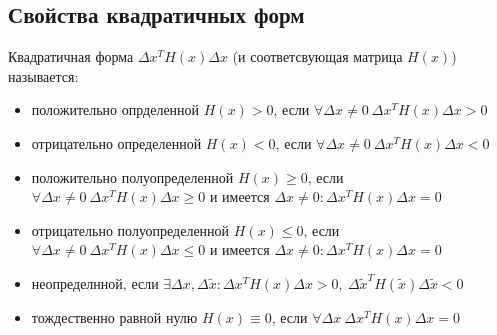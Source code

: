 \documentclass[oneside]{book}
\theoremstyle{plain}
\theoremstyle{remark}
\theoremstyle{definition}
\begin{document}
\subsection{Свойства квадратичных форм}
\label{sec:orgccb4229}
Квадратичная форма \(\Delta x^T H(x) \Delta x\) (и соответсвующая матрица \(H(x)\)) называется:
\begin{itemize}
\item положительно опрделенной \(H(x) > 0\), если \(\forall \Delta x \neq 0\ \Delta x^T H(x) \Delta x > 0\)
\item отрицательно определенной \(H(x) < 0\), если \(\forall \Delta x \neq 0\ \Delta x^T H(x) \Delta x < 0\)
\item положительно полуопределенной \(H(x) \ge 0\), если \(\forall \Delta x \neq 0\ \Delta x^T H(x) \Delta x \ge 0\)
и имеется \(\Delta x \neq 0: \Delta x^T H(x) \Delta x = 0\)
\item отрицательно полуопределенной \(H(x) \le 0\), если \(\forall \Delta x \neq 0\ \Delta x^T H(x) \Delta x \le 0\)
и имеется \(\Delta x \neq 0: \Delta x^T H(x) \Delta x = 0\)
\item неопределнной, если \(\exists \Delta x, \Delta \tilde{x}: \Delta x^T H(x) \Delta x > 0,\ \Delta \tilde{x}^T H(\tilde{x}) \Delta \tilde{x} < 0\)
\item тождественно равной нулю \(H(x) \equiv 0\), если \(\forall \Delta x\ \Delta x^T H(x) \Delta x = 0\)
\end{itemize}
\end{document}
